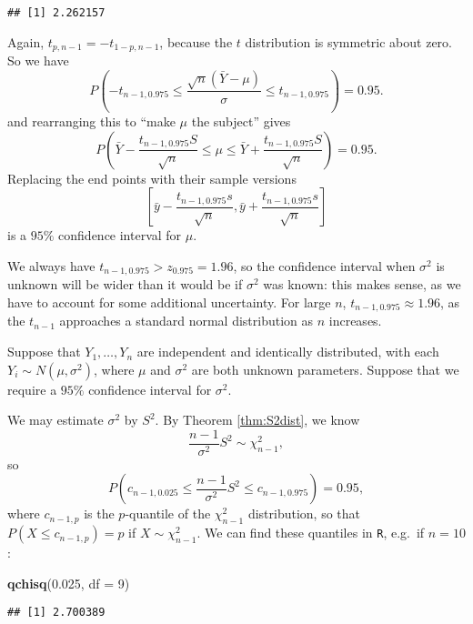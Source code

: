 \documentclass[]{book}
\newenvironment{Shaded}{\begin{snugshade}}{\end{snugshade}}
\newcommand{\KeywordTok}[1]{\textcolor[rgb]{0.13,0.29,0.53}{\textbf{#1}}}
\newcommand{\DataTypeTok}[1]{\textcolor[rgb]{0.13,0.29,0.53}{#1}}
\newcommand{\DecValTok}[1]{\textcolor[rgb]{0.00,0.00,0.81}{#1}}
\newcommand{\FloatTok}[1]{\textcolor[rgb]{0.00,0.00,0.81}{#1}}
\newcommand{\NormalTok}[1]{#1}
\theoremstyle{definition}
\theoremstyle{definition}
\theoremstyle{definition}
\theoremstyle{remark}
\let\BeginKnitrBlock\begin \let\EndKnitrBlock\end
\begin{document}
\begin{verbatim}
## [1] 2.262157
\end{verbatim}

Again, \(t_{p, n-1} = - t_{1 - p, n-1}\), because the \(t\) distribution
is symmetric about zero. So we have
\[P\left(-t_{n-1, 0.975} \leq \frac{\sqrt{n}(\bar Y - \mu)}{\sigma} \leq t_{n-1, 0.975}\right) = 0.95.\]
and rearranging this to ``make \(\mu\) the subject'' gives
\[P\left(\bar Y - \frac{t_{n-1, 0.975} S}{\sqrt{n}} \leq 
\mu \leq \bar Y + \frac{t_{n-1, 0.975} S}{\sqrt{n}} \right) = 0.95.\]
Replacing the end points with their sample versions
\[\left[\bar y - \frac{t_{n-1, 0.975} s}{\sqrt{n}},
\bar y + \frac{t_{n-1, 0.975} s}{\sqrt{n}} \right]\] is a \(95\%\)
confidence interval for \(\mu\).

We always have \(t_{n-1, 0.975} > z_{0.975} = 1.96\), so the confidence
interval when \(\sigma^2\) is unknown will be wider than it would be if
\(\sigma^2\) was known: this makes sense, as we have to account for some
additional uncertainty. For large \(n\),
\(t_{n-1, 0.975} \approx 1.96\), as the \(t_{n-1}\) approaches a
standard normal distribution as \(n\) increases.

\BeginKnitrBlock{example}[Normal variance]
\protect\hypertarget{exm:cinormvariance}{}{\label{exm:cinormvariance}
\iffalse (Normal variance) \fi{} }Suppose that \(Y_1, \ldots, Y_n\) are
independent and identically distributed, with each
\(Y_i \sim N(\mu, \sigma^2)\), where \(\mu\) and \(\sigma^2\) are both
unknown parameters. Suppose that we require a \(95 \%\) confidence
interval for \(\sigma^2\).

We may estimate \(\sigma^2\) by \(S^2\). By Theorem \ref{thm:S2dist}, we
know \[\frac{n-1}{\sigma^2} S^2 \sim \chi^2_{n-1},\] so
\[P\left(c_{n-1, 0.025} \leq \frac{n-1}{\sigma^2} S^2 
\leq c_{n-1, 0.975}\right) = 0.95,\] where \(c_{n-1, p}\) is the
\(p\)-quantile of the \(\chi^2_{n-1}\) distribution, so that
\(P(X \leq c_{n-1, p}) = p\) if \(X \sim \chi^2_{n-1}\). We can find
these quantiles in \texttt{R}, e.g.~if \(n = 10\):
\EndKnitrBlock{example}

\begin{Shaded}
\begin{Highlighting}[]
\KeywordTok{qchisq}\NormalTok{(}\FloatTok{0.025}\NormalTok{, }\DataTypeTok{df =} \DecValTok{9}\NormalTok{)}
\end{Highlighting}
\end{Shaded}

\begin{verbatim}
## [1] 2.700389
\end{verbatim}
\end{document}
